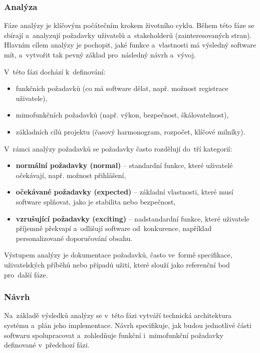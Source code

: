 \documentclass[male,czech,api_bc]{kitheses}
\begin{document}
\subsubsection{Analýza}

Fáze analýzy je klíčovým počátečním krokem životního cyklu. Během této fáze se sbírají a~analyzují požadavky uživatelů a~stakeholderů (zainteresovaných stran). Hlavním cílem analýzy je pochopit, jaké funkce a~vlastnosti má výsledný software mít, a~vytvořit tak pevný základ pro~následný návrh a~vývoj.

V~této fázi dochází k~definování:
\begin{itemize}
	\item funkčních požadavků (co má software dělat, např. možnost registrace uživatele),
	\item mimofunkčních požadavků (např. výkon, bezpečnost, škálovatelnost),
	\item základních cílů projektu (časový harmonogram, rozpočet, klíčové milníky).
\end{itemize}

V~rámci analýzy požadavků se požadavky často rozdělují do~tří kategorií:
\begin{itemize}
	\item \textbf{normální požadavky (normal)} – standardní funkce, které uživatelé očekávají, např. možnost přihlášení,
	\item \textbf{očekávané požadavky (expected)} – základní vlastnosti, které musí software splňovat, jako je stabilita nebo bezpečnost,
	\item \textbf{vzrušující požadavky (exciting)} – nadstandardní funkce, které uživatele příjemně překvapí a~odlišují software od~konkurence, například personalizované doporučování obsahu.
\end{itemize}

Výstupem analýzy je dokumentace požadavků, často ve~formě specifikace, uživatelských příběhů nebo případů užití, které slouží jako referenční bod pro~další fáze.

\subsubsection{Návrh}

Na~základě výsledků analýzy se v~této fázi vytváří technická architektura systému a~plán jeho implementace. Návrh specifikuje, jak budou jednotlivé části softwaru spolupracovat a~zohledňuje funkční i~mimofunkční požadavky definované v~předchozí fázi.
\end{document}
